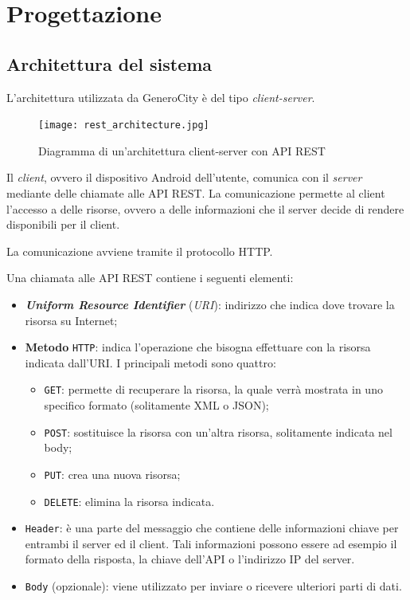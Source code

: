 \hypertarget{progettazione}{%
\chapter{Progettazione}\label{progettazione}}

\hypertarget{architettura-del-sistema}{%
\section{Architettura del sistema}\label{architettura-del-sistema}}

L'architettura utilizzata da GeneroCity è del tipo \emph{client-server}.

\begin{figure}[H]
\centering
\texttt{[image: rest\_architecture.jpg]}
\caption{Diagramma di un'architettura client-server con API REST \cite{what-is-restful-api}}
\end{figure}


Il \emph{client}, ovvero il dispositivo Android dell'utente, comunica con il \emph{server} mediante delle chiamate alle API REST. La comunicazione permette al client l'accesso a delle risorse, ovvero a delle informazioni che il server decide di rendere disponibili per il client. \cite{rest-api-design}

La comunicazione avviene tramite il protocollo HTTP.

Una chiamata alle API REST contiene i seguenti elementi:

\begin{itemize}
    \item \textbf{\emph{Uniform Resource Identifier}} (\emph{URI}): indirizzo che indica dove trovare la risorsa su Internet;
    \item \textbf{Metodo} \texttt{HTTP}: indica l'operazione che bisogna effettuare con la risorsa indicata dall'URI. I principali metodi sono quattro:

 \begin{itemize}     \item  \texttt{GET}: permette di recuperare la risorsa, la quale verrà  mostrata in uno specifico formato (solitamente XML o JSON);     \item  \texttt{POST}: sostituisce la risorsa con un'altra risorsa,  solitamente indicata nel body;     \item  \texttt{PUT}: crea una nuova risorsa;     \item  \texttt{DELETE}: elimina la risorsa indicata. \end{itemize}
    \item \texttt{Header}: è una parte del messaggio che contiene delle informazioni chiave per entrambi il server ed il client. Tali informazioni possono essere ad esempio il formato della risposta, la chiave dell'API o l'indirizzo IP del server.
    \item \texttt{Body} (opzionale): viene utilizzato per inviare o ricevere ulteriori parti di dati.
\end{itemize}

